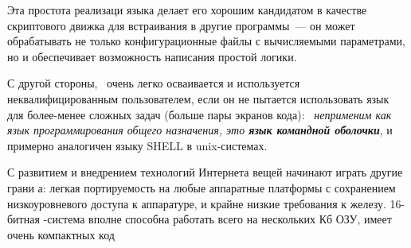 Эта простота реализаци языка делает его хорошим кандидатом в качестве
скриптового движка для встраивания в другие программы\ --- он может обрабатывать
не только конфигурационные файлы с вычисляемыми параметрами, но и обеспечивает
возможность написания простой логики.

С другой стороны, \F\ очень легко осваивается и используется неквалифицированным
пользователем, если он не пытается использовать язык для более-менее сложных
задач (больше пары экранов кода): \emph{\F\ неприменим как язык программирования
общего назначения, это \textbf{язык командной оболочки}}, и примерно аналогичен
языку SHELL в unix-системах.

\clearpage
С развитием и внедрением технологий Интернета вещей начинают играть другие грани
\F а: легкая портируемость на любые аппаратные платформы с сохранением
низкоуровневого доступа к аппаратуре, и крайне низкие требования к железу.
16-битная \F-система вполне способна работать всего на нескольких Кб ОЗУ, имеет
очень компактных код

